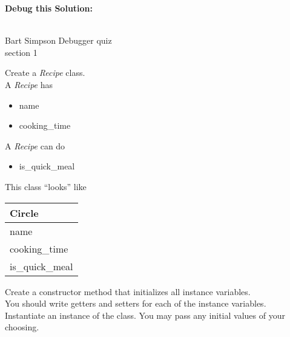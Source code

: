 \documentclass{article}
\begin{document}
\begin{enumerate}
		\textbf{Debug this Solution:}\\
		\mbox{ \hspace*{0.25in}	}

\pagebreak




\end{enumerate}
\pagebreak
Bart Simpson \hfill Debugger quiz\\
section 1\\
\begin{enumerate}

	\begin{minipage}{.6\textwidth}
		\item Create a \textit{Recipe} class.\\
		A \textit{Recipe} has
		\begin{itemize}
			\item name 
			\item cooking\_time
		\end{itemize}

		A \textit{Recipe} can do
		\begin{itemize}
			\item is\_quick\_meal
		\end{itemize}
	\end{minipage}
	\begin{minipage}{.4\textwidth}
		This class ``looks'' like 
				
		\vspace*{1em}
		\begin{tabular}{|l|}
			\hline Circle\\ \hline
			name\\ cooking\_time \\  \hline
			is\_quick\_meal\\ \hline
		\end{tabular}
	\end{minipage}

	\vspace*{2ex}
	Create a constructor method that initializes all instance variables.\\
	You should write getters and setters for each of the instance variables.\\
	Instantiate an instance of the class. You may pass any initial values of your choosing.	


\end{enumerate}
\end{document}
